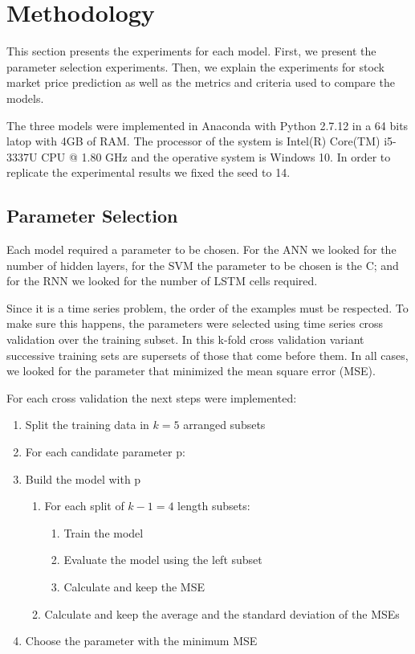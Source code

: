 \chapter{Methodology}

\label{ch:methodology}

This section presents the experiments for each model. First, we present the parameter selection experiments. Then, we explain the experiments for stock market price prediction as well as the metrics and criteria used to compare the models.

The three models were implemented in Anaconda with Python 2.7.12 in a 64 bits latop with 4GB of RAM. The processor of the system is Intel(R) Core(TM) i5-3337U CPU @ 1.80 GHz and the operative system is Windows 10. In order to replicate the experimental results we fixed the seed to 14. 
\section{Parameter Selection}

Each model required a parameter to be chosen. For the ANN we looked for the number of hidden layers, for the SVM the  parameter to be chosen is the C; and for the RNN we looked for the number of LSTM cells required.

Since it is a time series problem, the order of the examples must be respected. To make sure this happens, the parameters were selected using time series cross validation over the training subset. In this k-fold cross validation variant successive training sets are supersets of those that come before them. In all cases, we looked for the parameter that minimized the mean square error (MSE). 

For each cross validation the next steps were implemented:
\begin{enumerate}
\item Split the training data in $k=5$ arranged subsets
\item For each candidate parameter p:
\item  Build the model with p
\begin{enumerate}
\item For each split of $k-1=4$ length subsets:
\begin{enumerate}
\item Train the model
\item Evaluate the model using the left subset
\item Calculate and keep the MSE
\end{enumerate}
\item Calculate and keep the average and the standard deviation of the MSEs
\end{enumerate}
\item Choose the parameter with the minimum MSE
\end{enumerate}

